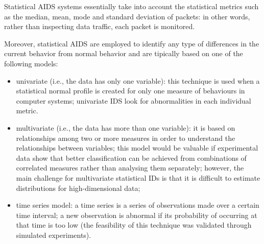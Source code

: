 Statistical AIDS systems essentially take into account the statistical metrics such as the median, mean, mode and standard deviation of packets: in other words, rather than inspecting data traffic, each packet is monitored.

Moreover, statistical AIDS are employed to identify any type of differences in the current behavior from normal behavior and are tipically based on one of the following models:
\begin{itemize}
    \item univariate (i.e., the data has only one variable): this technique is used when a statistical normal profile is created for only one measure of behaviours in computer systems; univariate IDS look for abnormalities in each individual metric.
    \item multivariate (i.e., the data has more than one variable): it is based on relationships among two or more measures in order to understand the relationships between variables; this model would be valuable if experimental data show that better classification can be achieved from combinations of correlated measures rather than analysing them separately; however, the main challenge for multivariate statistical IDs is that it is difficult to estimate distributions for high-dimensional data;
    \item time series model: a time series is a series of observations made over a certain time interval; a new observation is abnormal if its probability of occurring at that time is too low (the feasibility of this technique was validated through simulated experiments).
\end{itemize}